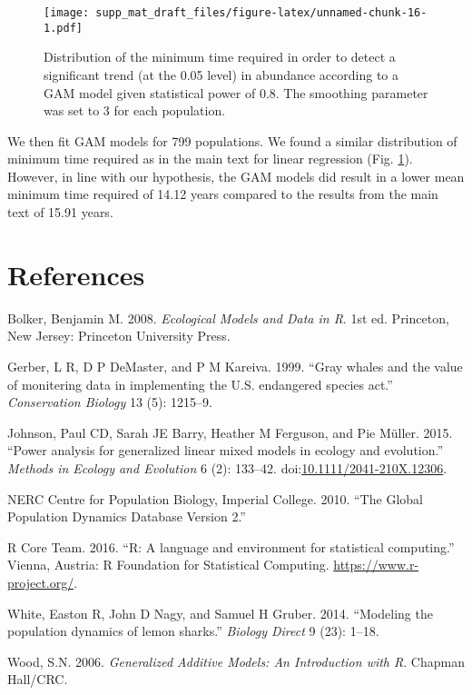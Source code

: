 \documentclass[12pt,]{article}
\begin{document}
\begin{figure}
\centering
\texttt{[image: supp\_mat\_draft\_files/figure-latex/unnamed-chunk-16-1.pdf]}
\caption{Distribution of the minimum time required in order to detect a
significant trend (at the 0.05 level) in abundance according to a GAM
model given statistical power of 0.8. The smoothing parameter was set to
3 for each population.\label{fig:min_time_dist_gam}}
\end{figure}

We then fit GAM models for 799 populations. We found a similar
distribution of minimum time required as in the main text for linear
regression (Fig. \ref{fig:min_time_dist_gam}). However, in line with our
hypothesis, the GAM models did result in a lower mean minimum time
required of 14.12 years compared to the results from the main text of
15.91 years.

\clearpage

\section*{References}\label{references}

\hypertarget{refs}{}
\hypertarget{ref-Bolker2008}{}
Bolker, Benjamin M. 2008. \emph{Ecological Models and Data in R}. 1st
ed. Princeton, New Jersey: Princeton University Press.

\hypertarget{ref-Gerber1999}{}
Gerber, L R, D P DeMaster, and P M Kareiva. 1999. ``Gray whales and the
value of monitering data in implementing the U.S. endangered species
act.'' \emph{Conservation Biology} 13 (5): 1215--9.

\hypertarget{ref-Johnson2015}{}
Johnson, Paul CD, Sarah JE Barry, Heather M Ferguson, and Pie Müller.
2015. ``Power analysis for generalized linear mixed models in ecology
and evolution.'' \emph{Methods in Ecology and Evolution} 6 (2): 133--42.
doi:\href{https://doi.org/10.1111/2041-210X.12306}{10.1111/2041-210X.12306}.

\hypertarget{ref-GPDD2010}{}
NERC Centre for Population Biology, Imperial College. 2010. ``The Global
Population Dynamics Database Version 2.''

\hypertarget{ref-RCoreTeam2016}{}
R Core Team. 2016. ``R: A language and environment for statistical
computing.'' Vienna, Austria: R Foundation for Statistical Computing.
\url{https://www.r-project.org/}.

\hypertarget{ref-White2014}{}
White, Easton R, John D Nagy, and Samuel H Gruber. 2014. ``Modeling the
population dynamics of lemon sharks.'' \emph{Biology Direct} 9 (23):
1--18.

\hypertarget{ref-Wood2006}{}
Wood, S.N. 2006. \emph{Generalized Additive Models: An Introduction with
R}. Chapman Hall/CRC.
\end{document}
